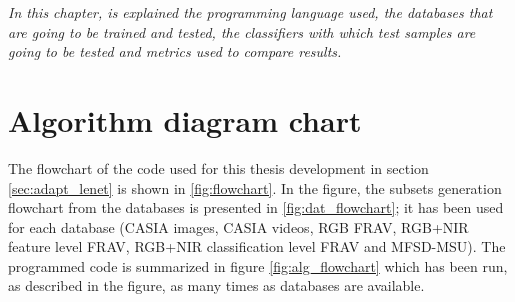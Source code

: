 \begin{small}
\emph{In this chapter, is explained the programming language used, the databases that are going to be trained and tested, the classifiers with which test samples are going to be tested and metrics used to compare results.}
\end{small}





\section{Algorithm diagram chart}
The flowchart of the code used for this thesis development in section \ref{sec:adapt_lenet} is shown in \ref{fig:flowchart}. In the figure, the subsets generation flowchart from the databases is presented in \ref{fig:dat_flowchart}; it has been used for each database (CASIA images, CASIA videos, RGB FRAV, RGB+NIR feature level FRAV, RGB+NIR classification level FRAV and MFSD-MSU). The programmed code is summarized in figure \ref{fig:alg_flowchart} which has been run, as described in the figure, as many times as databases are available.


